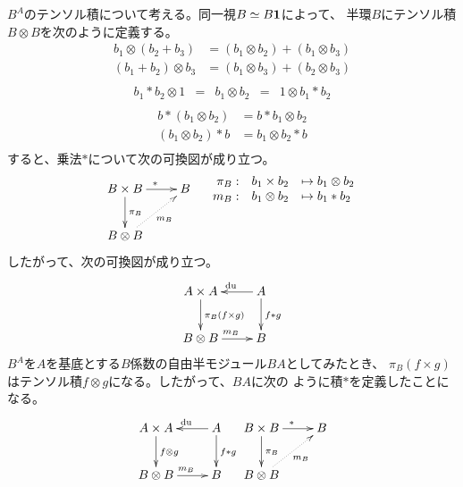	$B^A$のテンソル積について考える。同一視$B\simeq B{\mathbf{1}}$によって、
	半環$B$にテンソル積$B\otimes B$を次のように定義する。
	\begin{equation}\begin{split} %
		b_1\otimes (b_2+b_3) &= (b_1\otimes b_2)+(b_1\otimes b_3) \\
		(b_1+b_2)\otimes b_3 &= (b_1\otimes b_3)+(b_2\otimes b_3) \\
	\end{split}\end{equation} %
	\begin{equation}\begin{array}{ccccc} %
		b_1*b_2\otimes 1 &=& b_1\otimes b_2 &=& 1\otimes b_1*b_2 \\
	\end{array}\end{equation} %
	\begin{equation}\begin{split} %
		b*(b_1\otimes b_2) &= b*b_1\otimes b_2 \\
		(b_1\otimes b_2)*b &= b_1\otimes b_2*b \\
	\end{split}\end{equation} %
	すると、乗法$*$について次の可換図が成り立つ。
	\begin{equation}\xymatrix{
		B\times B \ar[r]^{*} \ar[d]^{\pi_B} & B \\
		B\otimes B \ar@{.>}[ru]_{m_B} \\
	}\quad\begin{array}{rrl}
		\pi_B: & b_1\times b_2 &\mapsto b_1\otimes b_2 \\
		m_B : & b_1\otimes b_2 &\mapsto b_1*b_2 \\
	\end{array}\end{equation}
	したがって、次の可換図が成り立つ。
	\begin{equation}\xymatrix{
		A\times A \ar[d]^{\pi_B(f\times g)} & A \ar[l]_{\mydu} \ar[d]^{f*g} \\
		B\otimes B \ar[r]^{m_B} & B \\
	}\end{equation}
	$B^A$を$A$を基底とする$B$係数の自由半モジュール$BA$としてみたとき、
	$\pi_B(f\times g)$はテンソル積$f\otimes g$になる。したがって、$BA$に次の
	ように積$*$を定義したことになる。
	\begin{equation}\xymatrix{
		A\times A \ar[d]^{f\otimes g} & A \ar[l]_{\mydu} \ar[d]^{f*g} \\
		B\otimes B \ar[r]^{m_B} & B \\
	}\xymatrix{
		B\times B \ar[r]^{*} \ar[d]^{\pi_B} & B \\
		B\otimes B \ar@{.>}[ru]_{m_B} \\
	}\end{equation}


